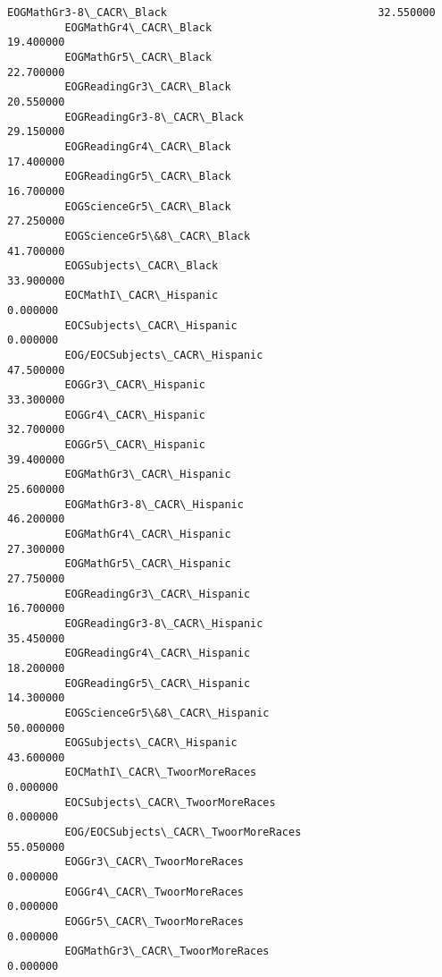 \documentclass[11pt]{article}
\begin{document}
\begin{Verbatim}[commandchars=\\\{\}]
         EOGMathGr3-8\_CACR\_Black                                 32.550000   
         EOGMathGr4\_CACR\_Black                                   19.400000   
         EOGMathGr5\_CACR\_Black                                   22.700000   
         EOGReadingGr3\_CACR\_Black                                20.550000   
         EOGReadingGr3-8\_CACR\_Black                              29.150000   
         EOGReadingGr4\_CACR\_Black                                17.400000   
         EOGReadingGr5\_CACR\_Black                                16.700000   
         EOGScienceGr5\_CACR\_Black                                27.250000   
         EOGScienceGr5\&8\_CACR\_Black                              41.700000   
         EOGSubjects\_CACR\_Black                                  33.900000   
         EOCMathI\_CACR\_Hispanic                                   0.000000   
         EOCSubjects\_CACR\_Hispanic                                0.000000   
         EOG/EOCSubjects\_CACR\_Hispanic                           47.500000   
         EOGGr3\_CACR\_Hispanic                                    33.300000   
         EOGGr4\_CACR\_Hispanic                                    32.700000   
         EOGGr5\_CACR\_Hispanic                                    39.400000   
         EOGMathGr3\_CACR\_Hispanic                                25.600000   
         EOGMathGr3-8\_CACR\_Hispanic                              46.200000   
         EOGMathGr4\_CACR\_Hispanic                                27.300000   
         EOGMathGr5\_CACR\_Hispanic                                27.750000   
         EOGReadingGr3\_CACR\_Hispanic                             16.700000   
         EOGReadingGr3-8\_CACR\_Hispanic                           35.450000   
         EOGReadingGr4\_CACR\_Hispanic                             18.200000   
         EOGReadingGr5\_CACR\_Hispanic                             14.300000   
         EOGScienceGr5\&8\_CACR\_Hispanic                           50.000000   
         EOGSubjects\_CACR\_Hispanic                               43.600000   
         EOCMathI\_CACR\_TwoorMoreRaces                             0.000000   
         EOCSubjects\_CACR\_TwoorMoreRaces                          0.000000   
         EOG/EOCSubjects\_CACR\_TwoorMoreRaces                     55.050000   
         EOGGr3\_CACR\_TwoorMoreRaces                               0.000000   
         EOGGr4\_CACR\_TwoorMoreRaces                               0.000000   
         EOGGr5\_CACR\_TwoorMoreRaces                               0.000000   
         EOGMathGr3\_CACR\_TwoorMoreRaces                           0.000000   

\end{Verbatim}
\end{document}
